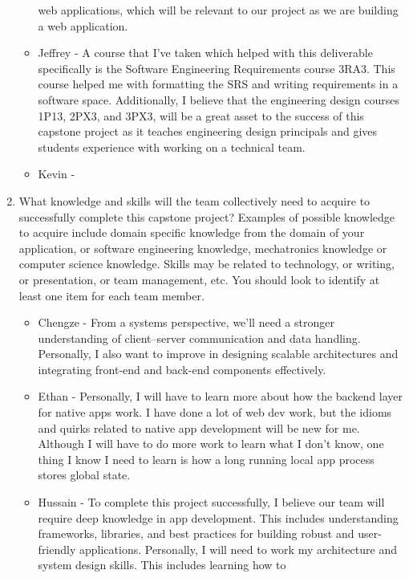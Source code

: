 \begin{enumerate}
\begin{itemize}
        web applications, which will be relevant to our project as we are 
        building a web application.
        \item Jeffrey - A course that I've taken which helped with this deliverable
        specifically is the Software Engineering Requirements course 3RA3. This course
        helped me with formatting the SRS and writing requirements in a software space.
        Additionally, I believe that the engineering design courses 1P13, 2PX3, 
        and 3PX3, will be a great asset to the success of this capstone project 
        as it teaches engineering design principals and gives students experience 
        with working on a technical team. 
        \item Kevin - 
  \end{itemize} 
  \item What knowledge and skills will the team collectively need to acquire to
  successfully complete this capstone project?  Examples of possible knowledge
  to acquire include domain specific knowledge from the domain of your
  application, or software engineering knowledge, mechatronics knowledge or
  computer science knowledge.  Skills may be related to technology, or writing,
  or presentation, or team management, etc.  You should look to identify at
  least one item for each team member.
  \begin{itemize}
        \item Chengze - From a systems perspective, we’ll need a stronger understanding 
        of client–server communication and data handling. Personally, I also want to 
        improve in designing scalable architectures and integrating front-end and back-end 
        components effectively.
        \item Ethan - Personally, I will have to learn more about how the
          backend layer for native apps work. I have done a lot of web dev
          work, but the idioms and quirks related to native app development
          will be new for me. Although I will have to do more work to learn
          what I don't know, one thing I know I need to learn is how a long
          running local app process stores global state.
        \item Hussain - To complete this project successfully, I believe our
        team will require deep knowledge in app development. This includes
        understanding frameworks, libraries, and best practices for building
        robust and user-friendly applications. Personally, I will need to work
        my architecture and system design skills. This includes learning how to

\end{itemize}
\end{enumerate}
